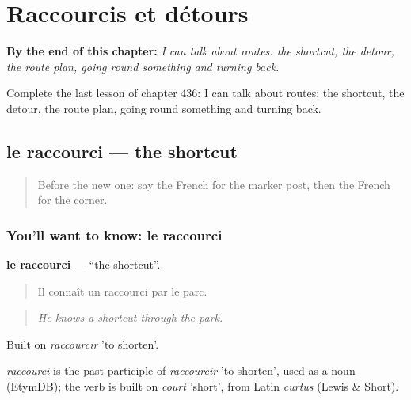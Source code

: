 
\chapter{Raccourcis et détours}
\label{ch:fr-raccourcis-et-detours}

\begin{chapteropening}
\textbf{By the end of this chapter:} \emph{I can talk about routes: the shortcut, the detour, the route plan, going round something and turning back.}

Complete the last lesson of chapter 436: I can talk about routes: the shortcut, the detour, the route plan, going round something and turning back.
\end{chapteropening}

\section[le raccourci]{le raccourci — the shortcut}

\label{lesson:FR-C436-raccourci}



\begin{quote}
Before the new one: say the French for the marker post, then the French for the corner.
\end{quote}

\subsection*{You'll want to know: le raccourci}
\textbf{le raccourci} — \textquotedblleft{}the shortcut\textquotedblright{}.

\begin{quote}
Il connaît un raccourci par le parc.
\end{quote}

\begin{quote}
\emph{He knows a shortcut through the park.}
\end{quote}

Built on \emph{raccourcir} 'to shorten'.

\begin{cousinweb}
\emph{raccourci} is the past participle of \emph{raccourcir} 'to shorten', used as a noun (EtymDB); the verb is built on \emph{court} 'short', from Latin \emph{curtus} (Lewis \& Short).
\end{cousinweb}

